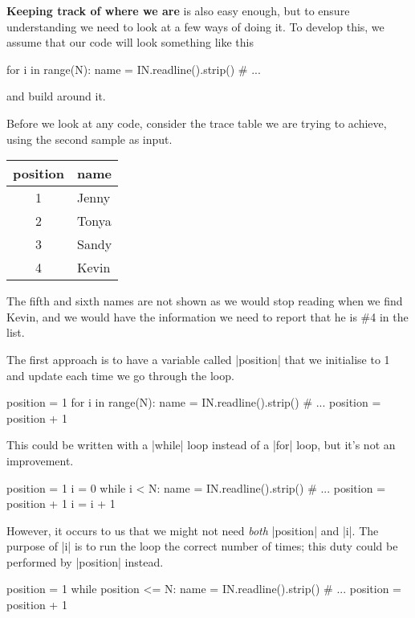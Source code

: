 \textbf{Keeping track of where we are} is also easy enough, but to ensure understanding we
need to look at a few ways of doing it. To develop this, we assume that our code will look
something like this
\begin{pythoncode}
  for i in range(N):
    name = IN.readline().strip()
    # ...
\end{pythoncode}
and build around it.

Before we look at any code, consider the trace table we are trying to achieve, using the
second sample as input.

\begin{center}
  \begin{tabular}{cl}
    \toprule
    position & name \\
    \midrule
    1 & Jenny \\
    2 & Tonya \\
    3 & Sandy \\
    4 & Kevin \\
    \bottomrule
  \end{tabular}
\end{center}
\medskip

The fifth and sixth names are not shown as we would stop reading when we find
Kevin, and we would have the information we need to report that he is \#4 in the list.

The first approach is to have a variable called \pycode|position| that we initialise to 1
and update each time we go through the loop.
\begin{pythoncode}
  position = 1
  for i in range(N):
    name = IN.readline().strip()
    # ...
    position = position + 1
\end{pythoncode}

This could be written with a \pycode|while| loop instead of a \pycode|for| loop, but it's
not an improvement.

\begin{pythoncode}
  position = 1
  i = 0
  while i < N:
    name = IN.readline().strip()
    # ...
    position = position + 1
    i = i + 1
\end{pythoncode}

However, it occurs to us that we might not need \emph{both} \pycode|position| and
\pycode|i|. The purpose of \pycode|i| is to run the loop the correct number of times; this
duty could be performed by \pycode|position| instead.

\begin{pythoncode}
  position = 1
  while position <= N:
    name = IN.readline().strip()
    # ...
    position = position + 1
\end{pythoncode}

